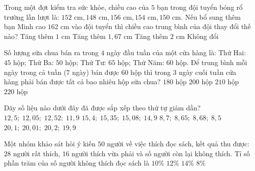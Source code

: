 \begin{ex} %
Trong một đợt kiểm tra sức khỏe, chiều cao của $5$ bạn trong đội tuyển bóng rổ trường lần lượt là: $152\text{ cm}, 148\text{ cm}, 156\text{ cm}, 154\text{ cm}, 150\text{ cm}$. Nếu bổ sung thêm bạn Minh cao $162\text{ cm}$ vào đội tuyển thì chiều cao trung bình của đội thay đổi thế nào?
\choice
{Tăng thêm $1\text{ cm}$}
{\True Tăng thêm $1{,}67\text{ cm}$}
{Tăng thêm $2\text{ cm}$}
{Không đổi}
\end{ex}

\begin{ex} %
Số lượng sữa chua bán ra trong $4$ ngày đầu tuần của một cửa hàng là: Thứ Hai: $45$ hộp; Thứ Ba: $50$ hộp; Thứ Tư: $65$ hộp; Thứ Năm: $60$ hộp. Để trung bình mỗi ngày trong cả tuần ($7$ ngày) bán được $60$ hộp thì trong $3$ ngày cuối tuần cửa hàng phải bán được tất cả bao nhiêu hộp sữa chua?
\choice
{$180\text{ hộp}$}
{\True $200\text{ hộp}$}
{$210\text{ hộp}$}
{$220\text{ hộp}$}
\end{ex}

\begin{ex} %
Dãy số liệu nào dưới đây đã được sắp xếp theo thứ tự giảm dần?
\choice
{$12{,}5;\; 12{,}05;\; 12{,}52;\; 11{,}9$}
{\True $15{,}4;\; 15{,}35;\; 15{,}08;\; 14{,}9$}
{$8{,}7;\; 8{,}65;\; 8{,}68;\; 8{,}5$}
{$20{,}1;\; 20{,}01;\; 20{,}2;\; 19{,}9$}
\end{ex}

\begin{ex} %
Một nhóm khảo sát hỏi ý kiến $50$ người về việc thích đọc sách, kết quả thu được: $28$ người rất thích, $16$ người thích vừa phải và số người còn lại không thích. Tỉ số phần trăm của số người không thích đọc sách là
\choice
{$10\%$}
{\True $12\%$}
{$14\%$}
{$8\%$}
\end{ex}

